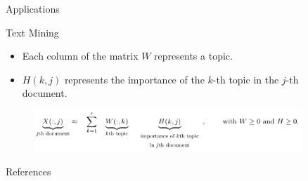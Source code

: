 \documentclass[final]{beamer}
\newlength{\sepwid}
\newlength{\onecolwid}
\newlength{\threecolwid}
\begin{document}
\begin{frame}
\begin{columns}[t]
\begin{column}{\threecolwid}
\begin{exampleblock}{Applications}
\begin{block}{Text Mining}
\begin{itemize}
    \item Each column of the matrix $W$ represents a topic.
    \item $H(k, j)$ represents the importance of the $k$-th topic in the $j$-th document.
\end{itemize}
\begin{figure}
    \centering
    \includegraphics{../images/NMF_app2.png}
\end{figure}
\end{block}
\end{exampleblock}
\begin{exampleblock}{References}
\nocite{biclique}
\nocite{NMF}
\printbibliography
\end{exampleblock}
\end{column}
\begin{column}{\sepwid}
\end{column} %
\begin{column}{\onecolwid} %



\end{column}
\end{columns}
\end{frame}
\end{document}
